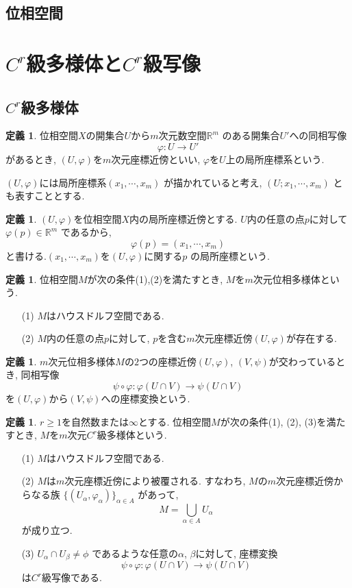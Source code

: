 \documentclass[a4j,12pt]{jarticle}
\theoremstyle{definition}
\newtheorem{definition}[theorem]{定義}
\begin{document}
\subsection{位相空間}
\newpage
%
\section{$C^r$級多様体と$C^r$級写像}
\subsection{$C^r$級多様体}
\begin{definition}
    位相空間$X$の開集合$U$から$m$次元数空間$\mathbb{R}^m$
    のある開集合$U'$への同相写像
    $$\varphi:U\rightarrow U'$$
    があるとき, $(U, \varphi)$を$m$次元座標近傍といい, 
    $\varphi$を$U$上の局所座標系という. 
\end{definition}
$(U,\varphi)$には局所座標系$(x_1, \cdots ,x_m)$
    が描かれていると考え, $(U;x_1, \cdots ,x_m)$
    とも表すこととする. 
\begin{definition}
    $(U, \varphi)$を位相空間$X$内の局所座標近傍とする.
    $U$内の任意の点$p$に対して$\varphi(p) \in \mathbb{R}^m$
    であるから, 
    $$\varphi(p)=(x_1, \cdots ,x_m)$$
    と書ける.$(x_1, \cdots ,x_m)$を$(U, \varphi)$に関する$p$
    の局所座標という.
\end{definition}
\begin{definition}
    位相空間$M$が次の条件(1),(2)を満たすとき, 
    $M$を$m$次元位相多様体という. 
    \begin{itemize}
        \item[(1)]$M$はハウスドルフ空間である.
        \item[(2)]$M$内の任意の点$p$に対して, 
        $p$を含む$m$次元座標近傍$(U,\varphi)$が存在する.
    \end{itemize}
\end{definition}
\begin{definition}
    $m$次元位相多様体$M$の$2$つの座標近傍$(U, \varphi)$, 
    $(V, \psi)$が交わっているとき, 同相写像
    $$\psi \circ \varphi:\varphi(U\cap V)\rightarrow \psi(U\cap V)$$
    を$(U, \varphi)$から$(V, \psi)$への座標変換という. 
\end{definition}
\begin{definition}\label{def:C^r manifold}
    $r\geq 1$を自然数または$\infty$とする. 
    位相空間$M$が次の条件(1), (2), (3)を満たすとき, 
    $M$を$m$次元$C^r$級多様体という.
    \begin{itemize}
        \item[(1)]$M$はハウスドルフ空間である.
        \item[(2)]$M$は$m$次元座標近傍により被覆される. 
        すなわち, $M$の$m$次元座標近傍からなる族
        $\{(U_\alpha, \varphi_\alpha)\}_{\alpha \in A}$
        があって, 
        $$M = \bigcup_{\alpha \in A}U_\alpha$$
        が成り立つ. 
        \item[(3)]$U_\alpha \cap U_\beta \neq \phi$
        であるような任意の$\alpha$, $\beta$に対して, 座標変換
        $$\psi \circ \varphi:\varphi(U\cap V)\rightarrow \psi(U\cap V)$$
        は$C^r$級写像である. 
    \end{itemize}
\end{definition}
\end{document}
